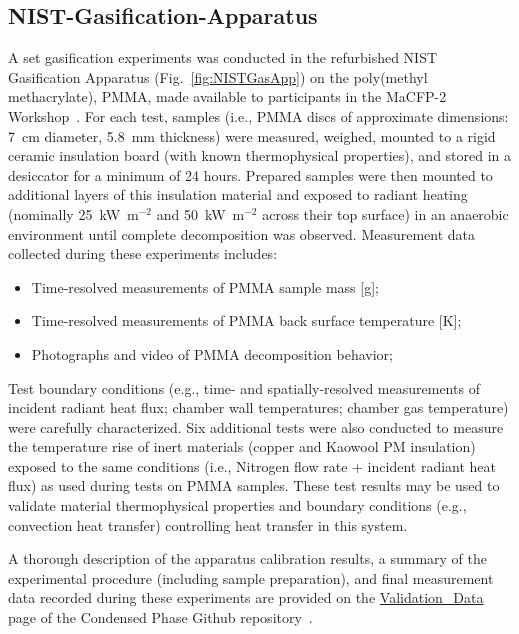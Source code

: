 \documentclass[12pt]{article}
\begin{document}
\subsection{NIST-Gasification-Apparatus}
A set gasification experiments was conducted in the refurbished NIST Gasification Apparatus (Fig.~\ref{fig:NISTGasApp}) on the poly(methyl methacrylate), PMMA, made available to participants in the MaCFP-2 Workshop~\cite{Leventon2023Gasification}. For each test, samples (i.e., PMMA discs of approximate dimensions: 7~cm diameter, 5.8~mm thickness) were measured, weighed, mounted to a rigid ceramic insulation board (with known thermophysical properties), and stored in a desiccator for a minimum of 24 hours. Prepared samples were then mounted to additional layers of this insulation material and exposed to radiant heating (nominally 25~kW~m$^{-2}$ and 50~kW~m$^{-2}$ across their top surface) in an anaerobic environment until complete decomposition was observed. Measurement data collected during these experiments includes:
\begin{itemize}[noitemsep]
\item Time-resolved measurements of PMMA sample mass [g];
\item Time-resolved measurements of PMMA back surface temperature [K];
\item Photographs and video of PMMA decomposition behavior;
\end{itemize}

Test boundary conditions (e.g., time- and spatially-resolved measurements of incident radiant heat flux; chamber wall temperatures; chamber gas temperature) were carefully characterized. Six additional tests were also conducted to measure the temperature rise of inert materials (copper and Kaowool PM insulation) exposed to the same conditions (i.e., Nitrogen flow rate + incident radiant heat flux) as used during tests on PMMA samples. These test results may be used to validate material thermophysical properties and boundary conditions (e.g., convection heat transfer) controlling heat transfer in this system.

A thorough description of the apparatus calibration results, a summary of the experimental procedure (including sample preparation), and final measurement data recorded during these experiments are provided on the \href{https://github.com/MaCFP/matl-db/tree/master/PMMA/Validation_Data/NIST_Gasification_Apparatus}{Validation\_Data} page of the Condensed Phase Github repository~\cite{MaCFP-cond-db}.
\end{document}
